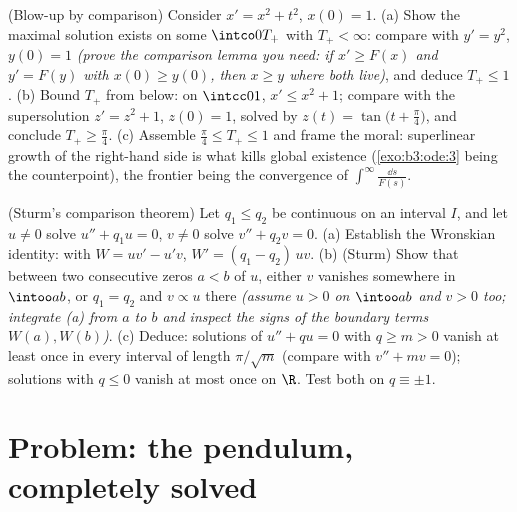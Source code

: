 \begin{exercise}[$\star\star$]\label{exo:b3:ode:11}
(Blow-up by comparison) Consider $x' = x^2 + t^2$, $x(0) =
1$.
(a) Show the maximal solution exists on some $\intco0{T_+}$
with $T_+ < \infty$: compare with $y' = y^2$, $y(0) = 1$
\emph{(prove the comparison lemma you need: if $x' \geq
F(x)$ and $y' = F(y)$ with $x(0) \geq y(0)$, then $x \geq
y$ where both live)}, and deduce $T_+ \leq 1$.
(b) Bound $T_+$ from below: on $\intcc01$, $x' \leq x^2 +
1$; compare with the supersolution $z' = z^2 + 1$, $z(0) =
1$, solved by $z(t) = \tan\bigl(t + \frac\pi4\bigr)$, and
conclude $T_+ \geq \frac\pi4$.
(c) Assemble $\frac\pi4 \leq T_+ \leq 1$ and frame the
moral: superlinear growth of the right-hand side is what
kills global existence (\cref{exo:b3:ode:3} being the
counterpoint), the frontier being the convergence of
$\int^{\infty}\frac{\dd s}{F(s)}$.
\end{exercise}

\begin{exercise}[$\star\star\star$]\label{exo:b3:ode:12}
(Sturm's comparison theorem) Let $q_1 \leq q_2$ be
continuous on an interval $I$, and let $u \neq 0$ solve $u''
+ q_1u = 0$, $v \neq 0$ solve $v'' + q_2v = 0$.
(a) Establish the Wronskian identity: with $W = uv' - u'v$,
$W' = (q_1 - q_2)\,uv$.
(b) (Sturm) Show that between two consecutive zeros $a < b$
of $u$, either $v$ vanishes somewhere in $\intoo ab$, or
$q_1 = q_2$ and $v \propto u$ there \emph{(assume $u > 0$
on $\intoo ab$ and $v > 0$ too; integrate (a) from $a$ to
$b$ and inspect the signs of the boundary terms $W(a),
W(b)$)}.
(c) Deduce: solutions of $u'' + qu = 0$ with $q \geq m > 0$
vanish at least once in every interval of length
$\pi/\sqrt m$ (compare with $v'' + mv = 0$); solutions with
$q \leq 0$ vanish at most once on $\R$. Test both on
$q \equiv \pm1$.
\end{exercise}

\section{Problem: the pendulum, completely solved}

